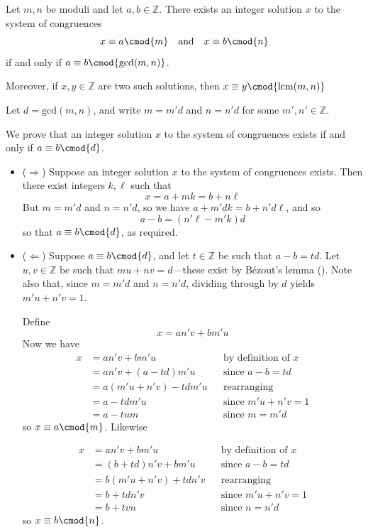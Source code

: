 \begin{theorem}
\label{thmCRTGeneral}
Let $m,n$ be moduli and let $a,b \in \mathbb{Z}$. There exists an integer solution $x$ to the system of congruences
\[ x \equiv a \cmod{m} \quad \text{and} \quad x \equiv b \cmod{n} \]
if and only if $a \equiv b \cmod{\mathrm{gcd}(m,n)}$.

Moreover, if $x,y \in \mathbb{Z}$ are two such solutions, then $x \equiv y \cmod{\mathrm{lcm}(m,n)}$
\end{theorem}
\begin{cproof}
Let $d=\mathrm{gcd}(m,n)$, and write $m=m'd$ and $n=n'd$ for some $m',n' \in \mathbb{Z}$.

We prove that an integer solution $x$ to the system of congruences exists if and only if $a \equiv b \cmod{d}$.

\begin{itemize}
\item ($\Rightarrow$) Suppose an integer solution $x$ to the system of congruences exists. Then there exist integers $k, \ell$ such that
\[ x = a+mk = b+n\ell \]
But $m=m'd$ and $n=n'd$, so we have $a+m'dk=b+n'd\ell$, and so
\[ a-b = (n'\ell - m'k)d \]
so that $a \equiv b \cmod{d}$, as required.

\item ($\Leftarrow$) Suppose $a \equiv b \cmod{d}$, and let $t \in \mathbb{Z}$ be such that $a-b=td$. Let $u,v \in \mathbb{Z}$ be such that $mu+nv=d$---these exist by B\'{e}zout's lemma (). Note also that, since $m=m'd$ and $n=n'd$, dividing through by $d$ yields $m'u+n'v=1$.

Define
\[ x = an'v+bm'u \]
Now we have
\begin{align*}
x &= an'v + bm'u && \text{by definition of $x$} \\
&= an'v + (a-td)m'u && \text{since $a-b=td$} \\
&= a(m'u+n'v) - tdm'u && \text{rearranging} \\
&= a - tdm'u && \text{since $m'u+n'v=1$} \\
&= a - tum && \text{since $m=m'd$}
\end{align*}
so $x \equiv a \cmod{m}$. Likewise

\begin{align*}
x &= an'v+bm'u && \text{by definition of $x$} \\
&= (b+td)n'v + bm'u && \text{since $a-b=td$} \\
&= b(m'u+n'v) + tdn'v && \text{rearranging} \\
&= b + tdn'v && \text{since $m'u+n'v=1$} \\
&= b + tvn && \text{since $n=n'd$}
\end{align*}
so $x \equiv b \cmod{n}$.


\end{itemize}
\end{cproof}
